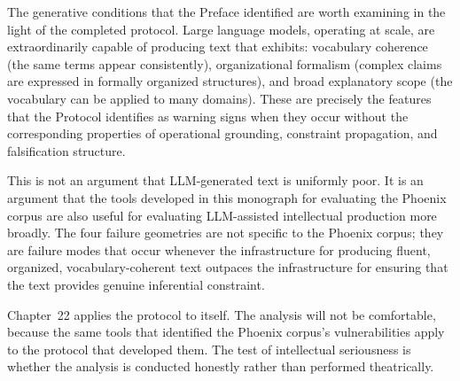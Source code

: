 The generative conditions that the Preface identified
are worth examining in the light of the completed
protocol. Large language models, operating at scale,
are extraordinarily capable of producing text that
exhibits: vocabulary coherence (the same terms appear
consistently), organizational formalism (complex claims
are expressed in formally organized structures), and
broad explanatory scope (the vocabulary can be applied
to many domains). These are precisely the features
that the \Ortyx{} Protocol identifies as warning signs
when they occur without the corresponding properties
of operational grounding, constraint propagation,
and falsification structure.

This is not an argument that LLM-generated text is
uniformly poor. It is an argument that the tools developed
in this monograph for evaluating the Phoenix corpus
are also useful for evaluating LLM-assisted intellectual
production more broadly. The four failure geometries
are not specific to the Phoenix corpus; they are failure
modes that occur whenever the infrastructure for
producing fluent, organized, vocabulary-coherent text
outpaces the infrastructure for ensuring that the text
provides genuine inferential constraint.

\medskip

Chapter~22 applies the protocol to itself. The analysis
will not be comfortable, because the same tools that
identified the Phoenix corpus's vulnerabilities apply
to the protocol that developed them. The test of
intellectual seriousness is whether the analysis is
conducted honestly rather than performed theatrically.
